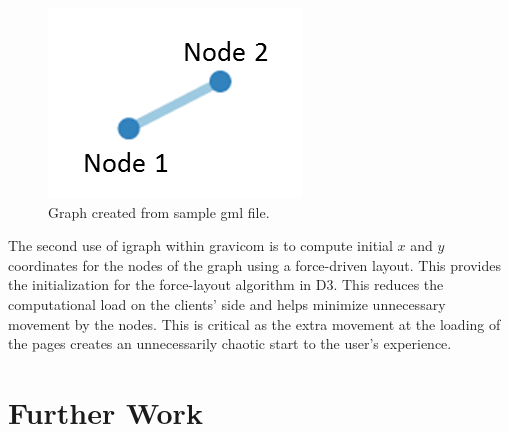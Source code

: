 \documentclass{article}\usepackage[]{graphicx}\usepackage[]{color}
\begin{document}
\begin{figure}[H]
\centering
\includegraphics{images/samplegraph.png}
\caption{\label{fig:samplegraph} Graph created from sample gml file.}
\end{figure}
The second use of igraph within gravicom is to compute initial $x$ and $y$ coordinates for the nodes of the graph using a force-driven layout. This provides the initialization for the force-layout algorithm in D3. This reduces the computational load on the clients' side and helps minimize unnecessary movement by the nodes. This is critical as the extra movement at the loading of the pages creates an unnecessarily chaotic start to the user's experience. 




\section{Further Work}

\printbibliography
\end{document}
